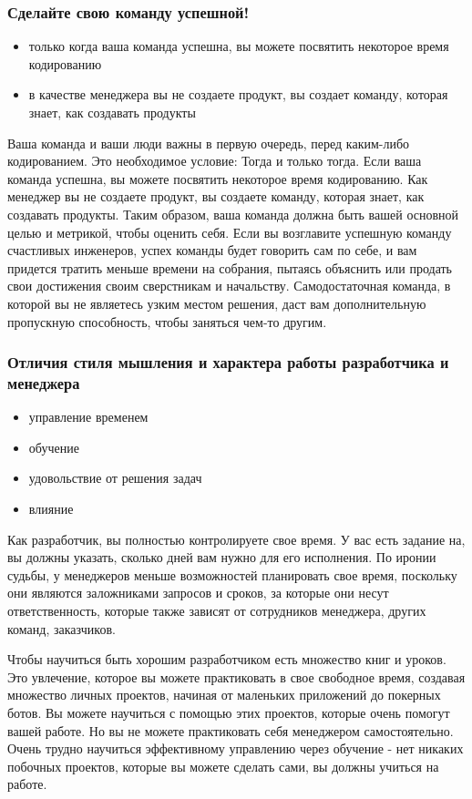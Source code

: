 \documentclass{../industrial-development}
\begin{document}
\begin{frame}\frametitle{Сделайте свою команду успешной!}
	\begin{itemize}
		\item только когда ваша команда успешна, вы можете посвятить некоторое время кодированию
		\item в качестве менеджера вы не создаете продукт, вы создает команду, которая знает, как создавать продукты
	\end{itemize}
\end{frame}
\lecturenotes
Ваша команда и ваши люди важны в первую очередь, перед каким-либо кодированием. Это необходимое условие: Тогда и только тогда. Если ваша команда успешна, вы можете посвятить некоторое время кодированию.
Как менеджер вы не создаете продукт, вы создаете команду, которая знает, как создавать продукты. Таким образом, ваша команда должна быть вашей основной целью и метрикой, чтобы оценить себя. Если вы возглавите успешную команду счастливых инженеров, успех команды будет говорить сам по себе, и вам придется тратить меньше времени на собрания, пытаясь объяснить или продать свои достижения своим сверстникам и начальству.
Самодостаточная команда, в которой вы не являетесь узким местом решения, даст вам дополнительную пропускную способность, чтобы заняться чем-то другим.
~\cite{From_engineer_to_manager_keeping_your_technical_skills}

\begin{frame}\frametitle{Отличия стиля мышления и характера работы разработчика и менеджера}
	\begin{itemize}
		\item управление временем
		\item обучение
		\item удовольствие от решения задач
		\item влияние
	\end{itemize}
\end{frame}
\lecturenotes
Как разработчик, вы полностью контролируете свое время. У вас есть задание на, вы должны указать, сколько дней вам нужно для его исполнения. По иронии судьбы, у менеджеров меньше возможностей планировать свое время, поскольку они являются заложниками запросов и сроков, за которые они несут ответственность, которые также зависят от сотрудников менеджера, других команд, заказчиков.

Чтобы научиться быть хорошим разработчиком есть множество книг и уроков. Это увлечение, которое вы можете практиковать в свое свободное время, создавая множество личных проектов, начиная от маленьких приложений до покерных ботов. Вы можете научиться с помощью этих проектов, которые очень помогут вашей работе. Но вы не можете практиковать себя менеджером самостоятельно. Очень трудно научиться эффективному управлению через обучение - нет никаких побочных проектов, которые вы можете сделать сами, вы должны учиться на работе.
\end{document}
